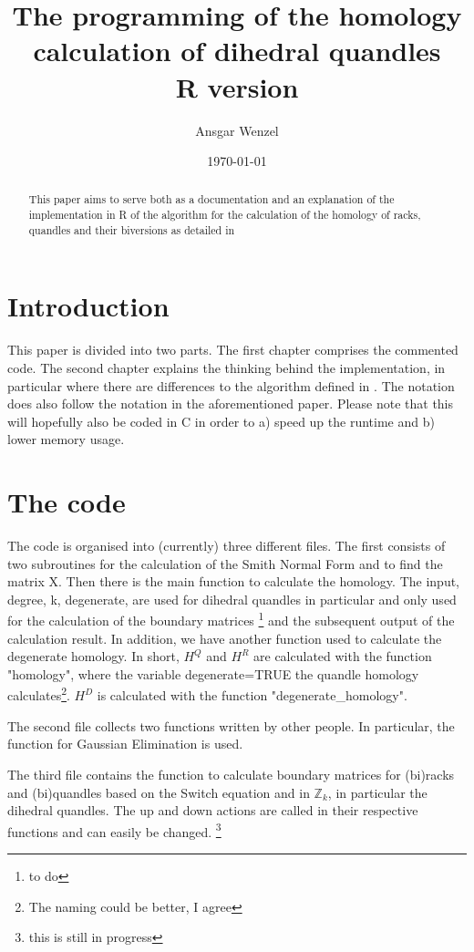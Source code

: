 \documentclass[11pt]{amsart}
\title{The programming of the homology calculation of dihedral quandles \\ R version}
\author{Ansgar Wenzel}
\date{\today}                                           %
\begin{document}
\begin{abstract}
This paper aims to serve both as a documentation and an explanation of the implementation in R of the algorithm for the calculation of the homology of racks, quandles and their biversions as detailed in \cite{Fenn1}
\end{abstract}
\maketitle
\section{Introduction}
This paper is divided into two parts. The first chapter comprises the commented code. The second chapter explains the thinking behind the implementation, in particular where there are differences to the algorithm defined in \cite{Fenn1}. The notation does also follow the notation in the aforementioned paper. Please note that this will hopefully also be coded in C in order to a) speed up the runtime and b) lower memory usage.
\section{The code}
The code is organised into (currently) three different files. The first consists of two subroutines for the calculation of the Smith Normal Form and to find the matrix X. Then there is the main function to calculate the homology. The input, degree, k, degenerate, are used for dihedral quandles in particular and only used for the calculation of the boundary matrices \footnote{to do} and the subsequent output of the calculation result. In addition, we have another function used to calculate the degenerate homology. In short, $H^Q$ and $H^R$ are calculated with the function "homology", where the variable degenerate=TRUE the quandle homology calculates\footnote{The naming could be better, I agree}. $H^D$ is calculated with the function "degenerate\_homology".

The second file collects two functions written by other people. In particular, the function for Gaussian Elimination is used.

The third file contains the function to calculate boundary matrices for (bi)racks and (bi)quandles based on the Switch equation and in $\mathbb{Z}_k$, in particular the dihedral quandles. The up and down actions are called in their respective functions and can easily be changed. \footnote{this is still in progress}

\end{document}
